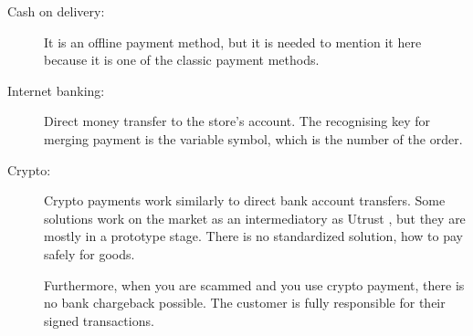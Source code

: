 \documentclass[thesis=M,english]{FITthesis}[2019/12/23]
\begin{document}
\begin{description}
\item[Cash on delivery:]
It is an offline payment method, but it is needed to mention it here because it is one of the classic payment methods. 

\item[Internet banking:]
Direct money transfer to the store's account. The recognising key for merging payment is the variable symbol, which is the number of the order. 

\item [Crypto:]
Crypto payments work similarly to direct bank account transfers. Some solutions work on the market as an intermediatory as Utrust \cite{utrust}, but they are mostly in a prototype stage. There is no standardized solution, how to pay safely for goods.
 
Furthermore, when you are scammed and you use crypto payment, there is no bank chargeback possible. The customer is fully responsible for their signed transactions.
\end{description}



\label{deliveryMethods}
\end{document}
